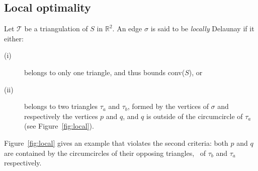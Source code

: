%
\subsection{Local optimality}
Let $\mathcal{T}$ be a triangulation of $S$ in $\mathbb{R}^2$. 
An edge $\sigma$ is said to be \emph{locally} Delaunay if it either:
\begin{description}
  \item[(i)] belongs to only one triangle, and thus bounds conv($S$), or
  \item[(ii)] belongs to two triangles $\tau_a$ and $\tau_b$, formed by the vertices of $\sigma$ and respectively the vertices $p$ and $q$, and $q$ is outside of the circumcircle of $\tau_a$ (see Figure~\ref{fig:local}). 
\end{description}
Figure~\ref{fig:local} gives an example that violates the second criteria: both $p$ and $q$ are contained by the circumcircles of their opposing triangles, \ie\ of $\tau_b$ and $\tau_a$ respectively.

